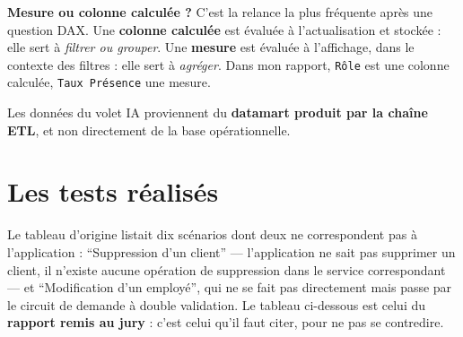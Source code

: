 \documentclass[a4paper,11pt]{article}
\begin{document}
\begin{coeur}
\textbf{Mesure ou colonne calculée ?} C'est la relance la plus fréquente après
une question DAX. Une \textbf{colonne calculée} est évaluée à l'actualisation et
stockée : elle sert à \emph{filtrer ou grouper}. Une \textbf{mesure} est évaluée
à l'affichage, dans le contexte des filtres : elle sert à \emph{agréger}. Dans
mon rapport, \texttt{Rôle} est une colonne calculée, \texttt{Taux Présence} une
mesure.
\end{coeur}

\begin{note}
\small Les données du volet IA proviennent du \textbf{datamart produit par la
chaîne ETL}, et non directement de la base opérationnelle.
\end{note}

\section{Les tests réalisés}

\begin{corrige}
Le tableau d'origine listait dix scénarios dont deux ne correspondent pas à
l'application : \enquote{Suppression d'un client} --- l'application ne sait pas
supprimer un client, il n'existe aucune opération de suppression dans le service
correspondant --- et \enquote{Modification d'un employé}, qui ne se fait pas
directement mais passe par le circuit de demande à double validation. Le tableau
ci-dessous est celui du \textbf{rapport remis au jury} : c'est celui qu'il faut
citer, pour ne pas se contredire.
\end{corrige}
\end{document}
